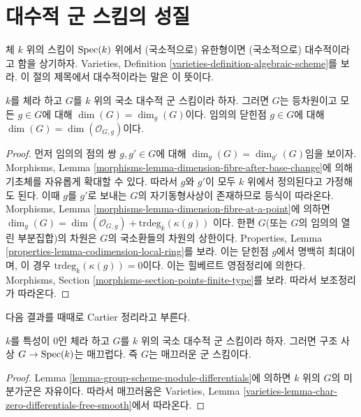 \section{대수적 군 스킴의 성질}
\label{section-algebraic-group-schemes}

\noindent
체 $k$ 위의 스킴이 $\mathop{\mathrm{Spec}}(k)$ 위에서 (국소적으로) 유한형이면 (국소적으로) 대수적이라고 함을 상기하자.
Varieties, Definition \ref{varieties-definition-algebraic-scheme}를 보라. 이 절의 제목에서 대수적이라는 말은 이 뜻이다.

\begin{lemma}
\label{lemma-group-scheme-finite-type-field}
$k$를 체라 하고 $G$를 $k$ 위의 국소 대수적 군 스킴이라 하자. 그러면 $G$는 등차원이고
모든 $g \in G$에 대해 $\dim(G) = \dim_g(G)$이다. 임의의 닫힌점 $g \in G$에 대해
$\dim(G) = \dim(\mathcal{O}_{G, g})$이다.
\end{lemma}

\begin{proof}
먼저 임의의 점의 쌍 $g, g' \in G$에 대해 $\dim_g(G) = \dim_{g'}(G)$임을 보이자.
Morphisms, Lemma \ref{morphisms-lemma-dimension-fibre-after-base-change}에 의해 기초체를 자유롭게 확대할 수 있다.
따라서 $g$와 $g'$이 모두 $k$ 위에서 정의된다고 가정해도 된다. 이때 $g$를 $g'$로 보내는
$G$의 자기동형사상이 존재하므로 등식이 따라온다. Morphisms, Lemma
\ref{morphisms-lemma-dimension-fibre-at-a-point}에 의하면
$\dim_g(G) = \dim(\mathcal{O}_{G, g}) +
\text{trdeg}_k(\kappa(g))$
이다. 한편 $G$(또는 $G$의 임의의 열린 부분집합)의 차원은 $G$의 국소환들의 차원의 상한이다.
Properties, Lemma \ref{properties-lemma-codimension-local-ring}를 보라. 이는 닫힌점 $g$에서 명백히 최대이며,
이 경우 $\text{trdeg}_k(\kappa(g)) = 0$이다. 이는 힐베르트 영점정리에 의한다. Morphisms, Section
\ref{morphisms-section-points-finite-type}를 보라. 따라서 보조정리가 따라온다.
\end{proof}

\noindent
다음 결과를 때때로 Cartier 정리라고 부른다.

\begin{lemma}
\label{lemma-group-scheme-characteristic-zero-smooth}
$k$를 특성이 $0$인 체라 하고 $G$를 $k$ 위의 국소 대수적 군 스킴이라 하자.
그러면 구조 사상 $G \to \mathop{\mathrm{Spec}}(k)$는 매끄럽다. 즉 $G$는 매끄러운 군 스킴이다.
\end{lemma}

\begin{proof}
Lemma \ref{lemma-group-scheme-module-differentials}에 의하면 $k$ 위의 $G$의 미분가군은 자유이다.
따라서 매끄러움은 Varieties, Lemma \ref{varieties-lemma-char-zero-differentials-free-smooth}에서 따라온다.
\end{proof}


